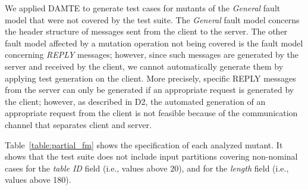 We applied DAMTE to generate test cases for mutants of the \emph{General} fault model that were not covered by the \PARAM test suite.
The \emph{General} fault model concerns the header structure of \PARAM messages sent from the \PARAM client to the \PARAM server. 
The other fault model affected by a mutation operation not being covered is the fault model concerning \emph{REPLY} messages;  however, since such messages are generated by the server and received by the client, we cannot automatically generate them by applying test generation on the client.  More precisely, specific REPLY messages from the server can only be generated if an appropriate request is generated by the client; however, as described in D2, the automated generation of an appropriate request from the client is not feasible because of the communication channel that separates client and server.

Table~\ref{table:partial_fm} shows the specification of each analyzed mutant. It shows that the \PARAM test suite does not include input partitions covering non-nominal cases for the \emph{table ID} field (i.e., values above 20), and for the \emph{length} field (i.e., values above 180).

